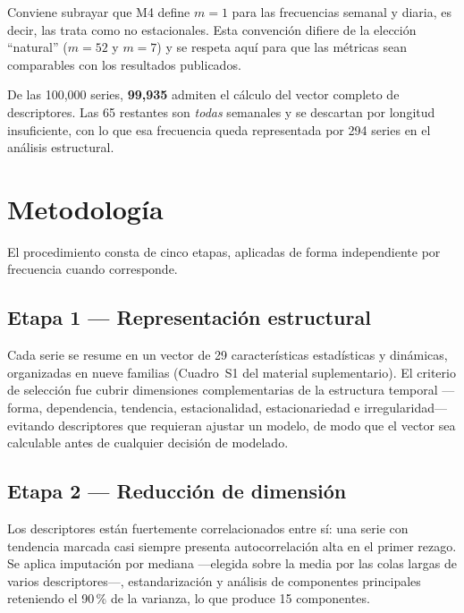 Conviene subrayar que M4 define $m=1$ para las frecuencias semanal y diaria, es
decir, las trata como no estacionales. Esta convención difiere de la elección
``natural'' ($m=52$ y $m=7$) y se respeta aquí para que las métricas sean
comparables con los resultados publicados.

De las 100{,}000 series, \textbf{99{,}935} admiten el cálculo del vector completo
de descriptores. Las 65 restantes son \emph{todas} semanales y se descartan por
longitud insuficiente, con lo que esa frecuencia queda representada por 294 series
en el análisis estructural.


\section{Metodología}\label{sec:metodo}

El procedimiento consta de cinco etapas, aplicadas de forma independiente por
frecuencia cuando corresponde.

\subsection{Etapa 1 --- Representación estructural}

Cada serie se resume en un vector de 29 características estadísticas y dinámicas,
organizadas en nueve familias (Cuadro~S1 del material suplementario). El criterio de selección
fue cubrir dimensiones complementarias de la estructura temporal ---forma,
dependencia, tendencia, estacionalidad, estacionariedad e irregularidad--- evitando
descriptores que requieran ajustar un modelo, de modo que el vector sea calculable
antes de cualquier decisión de modelado.



\subsection{Etapa 2 --- Reducción de dimensión}

Los descriptores están fuertemente correlacionados entre sí: una serie con
tendencia marcada casi siempre presenta autocorrelación alta en el primer rezago.
Se aplica imputación por mediana ---elegida sobre la media por las colas largas de
varios descriptores---, estandarización y análisis de componentes principales
reteniendo el 90\,\% de la varianza, lo que produce 15 componentes.

